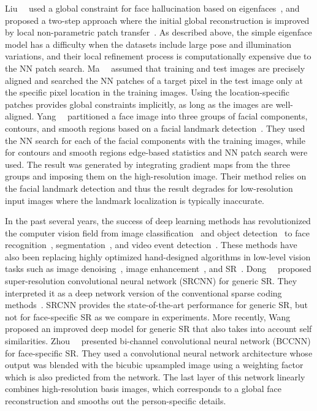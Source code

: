 \documentclass[runningheads]{llncs}
\begin{document}
Liu~\etal~\cite{Liu07} used a global constraint for face hallucination based on eigenfaces~\cite{turk1991eigenfaces}, and proposed a two-step approach where the initial global reconstruction is improved by local non-parametric patch transfer~\cite{freeman2002example}. As described above, the simple eigenface model has a difficulty when the datasets include large pose and illumination variations, and their local refinement process is computationally expensive due to the NN patch search.
Ma~\etal~\cite{Ma10PR} assumed that training and test images are precisely aligned and searched the NN patches of a target pixel in the test image only at the specific pixel location in the training images. Using the location-specific patches provides global constraints implicitly, as long as the images are well-aligned.
Yang~\etal~\cite{Yang13CVPR} partitioned a face image into three groups of facial components, contours, and smooth regions based on a facial landmark detection~\cite{Zhu12CVPR}. They used the NN search for each of the facial components with the training images, while for contours and smooth regions edge-based statistics and NN patch search were used. The result was generated by integrating gradient maps from the three groups and imposing them on the high-resolution image. Their method relies on the facial landmark detection and thus the result degrades for low-resolution input images where the landmark localization is typically inaccurate.


In the past several years, the success of deep learning methods has revolutionized the computer vision field from image classification~\cite{krizhevsky2012imagenet,simonyan2014very} and object detection~\cite{girshick2014rich} to face recognition~\cite{taigman2014deepface}, segmentation~\cite{farabet2013learning}, and video event detection~\cite{simonyan2014two}. These methods have also been replacing highly optimized hand-designed algorithms in low-level vision tasks such as image denoising~\cite{burger2012image,agostinelli2013adaptive,jain2009natural}, image enhancement~\cite{xie2012image,xu2014deep}, and SR~\cite{Dong15PAMI,wang2015self,Zhou15AAAI}.
%
Dong~\etal~\cite{Dong15PAMI} proposed super-resolution convolutional neural network (SRCNN) for generic SR. They interpreted it as a deep network version of the conventional sparse coding methods~\cite{yang2010image}. SRCNN provides the state-of-the-art performance for generic SR, but not for face-specific SR as we compare in experiments. More recently, Wang~\etal~\cite{wang2015self} proposed an improved deep model for generic SR that also takes into account self similarities.
%
Zhou~\etal~\cite{Zhou15AAAI} presented bi-channel convolutional neural network (BCCNN) for face-specific SR. They used a convolutional neural network architecture whose output was blended with the bicubic upsampled image using a weighting factor which is also predicted from the network.
The last layer of this network linearly combines high-resolution basis images, which corresponds to a global face reconstruction and smooths out the person-specific details.
\end{document}
